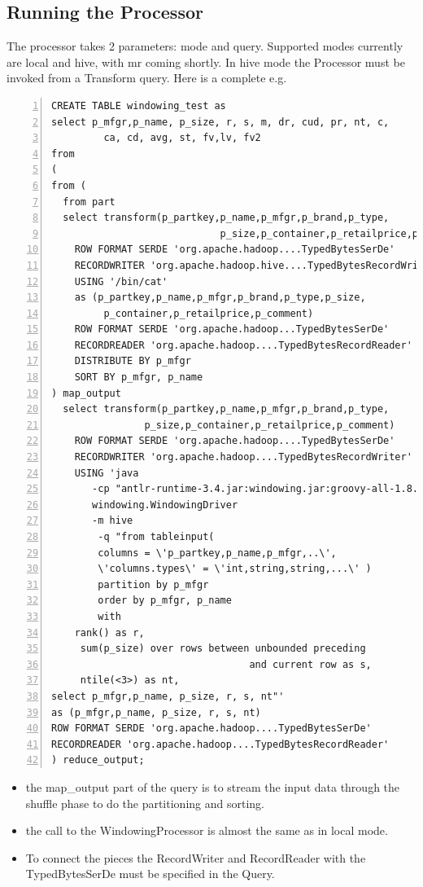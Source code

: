 \documentclass[pdftex,10pt,a4paper]{article}
\begin{document}
   \subsection{Running the Processor}
   
   The processor takes 2 parameters: mode and query. Supported modes currently are local and hive, with mr coming shortly.
   In hive mode the Processor must be invoked from a Transform query. Here is a complete e.g.
   
{\small
   \lstset{keywordstyle=\bfseries\underbar, emphstyle=\underbar,
     language=SQL, showspaces=false, showstringspaces=false}
   \begin{lstlisting}[caption={A complete  Hive Query},frame=shadowbox, numbers=left]
CREATE TABLE windowing_test as
select p_mfgr,p_name, p_size, r, s, m, dr, cud, pr, nt, c, 
         ca, cd, avg, st, fv,lv, fv2
from
(
from (
  from part
  select transform(p_partkey,p_name,p_mfgr,p_brand,p_type,
                             p_size,p_container,p_retailprice,p_comment)
    ROW FORMAT SERDE 'org.apache.hadoop....TypedBytesSerDe'
    RECORDWRITER 'org.apache.hadoop.hive....TypedBytesRecordWriter'
    USING '/bin/cat'
    as (p_partkey,p_name,p_mfgr,p_brand,p_type,p_size,
         p_container,p_retailprice,p_comment)
    ROW FORMAT SERDE 'org.apache.hadoop...TypedBytesSerDe'
    RECORDREADER 'org.apache.hadoop....TypedBytesRecordReader'
    DISTRIBUTE BY p_mfgr
    SORT BY p_mfgr, p_name
) map_output
  select transform(p_partkey,p_name,p_mfgr,p_brand,p_type,
                p_size,p_container,p_retailprice,p_comment)
    ROW FORMAT SERDE 'org.apache.hadoop....TypedBytesSerDe'
    RECORDWRITER 'org.apache.hadoop....TypedBytesRecordWriter'
    USING 'java 
       -cp "antlr-runtime-3.4.jar:windowing.jar:groovy-all-1.8.0.jar...." 
       windowing.WindowingDriver 
       -m hive 
        -q "from tableinput(
        columns = \'p_partkey,p_name,p_mfgr,..\', 
        \'columns.types\' = \'int,string,string,...\' ) 
        partition by p_mfgr 
        order by p_mfgr, p_name 
        with
  	rank() as r,
 	 sum(p_size) over rows between unbounded preceding 
 	                              and current row as s,
 	 ntile(<3>) as nt,
select p_mfgr,p_name, p_size, r, s, nt"'
as (p_mfgr,p_name, p_size, r, s, nt)
ROW FORMAT SERDE 'org.apache.hadoop....TypedBytesSerDe'
RECORDREADER 'org.apache.hadoop....TypedBytesRecordReader'
) reduce_output;
   \end{lstlisting}
   }
   
\begin{itemize}
\item the map\_output part of the query is to stream the input data through the shuffle phase to do the partitioning and sorting.
\item the call to the WindowingProcessor is almost the same as in local mode.
\item To connect the pieces the RecordWriter and RecordReader with the TypedBytesSerDe must be specified in the Query.
\end{itemize}
\end{document}
